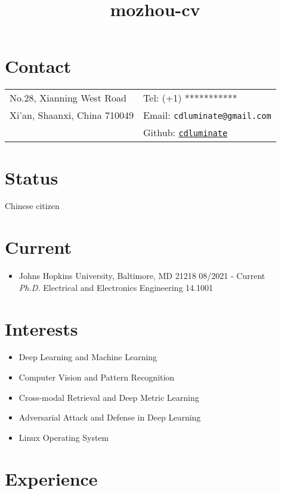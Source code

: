 \documentclass[margin,line,pifont,palatino,courier]{res}
\begin{document}
\title{mozhou-cv}
\begin{resume}

\section{\sc Contact}

\vspace{.05in}
\begin{tabular}{@{}p{2.2in}p{2.2in}}
No.28, Xianning West Road & Tel: (+1) *********** \\
Xi'an, Shaanxi, China 710049  & Email: \verb+cdluminate@gmail.com+\\
			& Github: \href{https://github.com/cdluminate}{\tt cdluminate}\\
\end{tabular}

\section{\sc Status}
Chinese citizen

\section{\sc Current}

\begin{itemize}[leftmargin=*]
\item Johns Hopkins University, Baltimore, MD 21218 \hfill 08/2021 - Current\\
	\textit{Ph.D.} Electrical and Electronics Engineering 14.1001
\end{itemize}

\section{\sc Interests}
\begin{itemize}[noitemsep, leftmargin=*]
	\item Deep Learning and Machine Learning
    \item Computer Vision and Pattern Recognition
	\item Cross-modal Retrieval and Deep Metric Learning 
	\item Adversarial Attack and Defense in Deep Learning
	\item Linux Operating System
\end{itemize}
 
\section{\sc Experience}


\end{resume}
\end{document}
